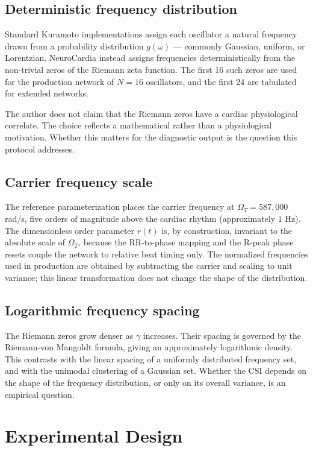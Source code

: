 \documentclass[11pt]{article}
\begin{document}
\subsection{Deterministic frequency distribution}

Standard Kuramoto implementations assign each oscillator a natural
frequency drawn from a probability distribution $g(\omega)$ ---
commonly Gaussian, uniform, or Lorentzian. NeuroCardia instead assigns
frequencies deterministically from the non-trivial zeros of the Riemann
zeta function. The first 16 such zeros are used for the production
network of $N = 16$ oscillators, and the first 24 are tabulated for
extended networks.

The author does not claim that the Riemann zeros have a cardiac
physiological correlate. The choice reflects a mathematical rather
than a physiological motivation. Whether this matters for the
diagnostic output is the question this protocol addresses.

\subsection{Carrier frequency scale}

The reference parameterization places the carrier frequency at
$\Omega_T = 587{,}000$ rad/s, five orders of magnitude above the cardiac
rhythm (approximately $1$ Hz). The dimensionless order parameter $r(t)$
is, by construction, invariant to the absolute scale of $\Omega_T$,
because the RR-to-phase mapping and the R-peak phase resets couple the
network to relative beat timing only. The normalized frequencies used in
production are obtained by subtracting the carrier and scaling to unit
variance; this linear transformation does not change the shape of the
distribution.

\subsection{Logarithmic frequency spacing}

The Riemann zeros grow denser as $\gamma$ increases. Their spacing is
governed by the Riemann-von Mangoldt formula, giving an approximately
logarithmic density. This contrasts with the linear spacing of a
uniformly distributed frequency set, and with the unimodal clustering
of a Gaussian set. Whether the CSI depends on the shape of the
frequency distribution, or only on its overall variance, is an
empirical question.

\section{Experimental Design}
\end{document}
